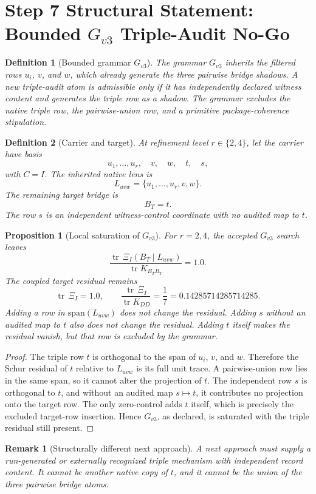 \documentclass[11pt]{article}
\newtheorem{definition}{Definition}
\newtheorem{proposition}{Proposition}
\newtheorem{remark}{Remark}
\DeclareMathOperator{\tr}{tr}
\begin{document}
\section*{Step 7 Structural Statement: Bounded \(G_{v3}\) Triple-Audit No-Go}

\begin{definition}[Bounded grammar \(G_{v3}\)]
The grammar \(G_{v3}\) inherits the filtered rows \(u_i\), \(v\), and \(w\),
which already generate the three pairwise bridge shadows.  A new triple-audit
atom is admissible only if it has independently declared witness content and
generates the triple row as a shadow.  The grammar excludes the native triple
row, the pairwise-union row, and a primitive package-coherence stipulation.
\end{definition}

\begin{definition}[Carrier and target]
At refinement level \(r\in\{2,4\}\), let the carrier have basis
\[
  u_1,\ldots,u_r,\quad v,\quad w,\quad t,\quad s,
\]
with \(C=I\).  The inherited native lens is
\[
  L_{uvw}=\{u_1,\ldots,u_r,v,w\}.
\]
The remaining target bridge is
\[
  B_T=t.
\]
The row \(s\) is an independent witness-control coordinate with no audited map
to \(t\).
\end{definition}

\begin{proposition}[Local saturation of \(G_{v3}\)]
For \(r=2,4\), the accepted \(G_{v3}\) search leaves
\[
  \frac{\tr\,\Xi_I(B_T\mid L_{uvw})}{\tr K_{B_TB_T}}=1.0.
\]
The coupled target residual remains
\[
  \tr\,\Xi_I=1.0,\qquad
  \frac{\tr\,\Xi_I}{\tr K_{DD}}=\frac{1}{7}=0.14285714285714285.
\]
Adding a row in \(\mathrm{span}(L_{uvw})\) does not change the residual.  Adding
\(s\) without an audited map to \(t\) also does not change the residual.
Adding \(t\) itself makes the residual vanish, but that row is excluded by the
grammar.
\end{proposition}

\begin{proof}
The triple row \(t\) is orthogonal to the span of \(u_i\), \(v\), and \(w\).
Therefore the Schur residual of \(t\) relative to \(L_{uvw}\) is its full
unit trace.  A pairwise-union row lies in the same span, so it cannot alter the
projection of \(t\).  The independent row \(s\) is orthogonal to \(t\), and
without an audited map \(s\mapsto t\), it contributes no projection onto the
target row.  The only zero-control adds \(t\) itself, which is precisely the
excluded target-row insertion.  Hence \(G_{v3}\), as declared, is saturated
with the triple residual still present.
\end{proof}

\begin{remark}[Structurally different next approach]
A next approach must supply a run-generated or externally recognized triple
mechanism with independent record content.  It cannot be another native copy of
\(t\), and it cannot be the union of the three pairwise bridge atoms.
\end{remark}
\end{document}
